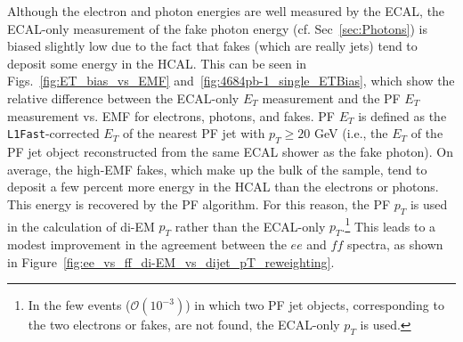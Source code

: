 \documentclass[dissertation.tex]{subfiles}
\begin{document}
Although the electron and photon energies are well measured by the ECAL, the ECAL-only measurement of the fake photon energy (cf. Sec~\ref{sec:Photons}) is biased slightly low due to the fact that fakes (which are really jets) tend to deposit some energy in the HCAL.  This can be seen in Figs.~\ref{fig:ET_bias_vs_EMF} and~\ref{fig:4684pb-1_single_ETBias}, which show the relative difference between the ECAL-only $E_{T}$ measurement and the PF $E_{T}$ measurement vs. EMF for electrons, photons, and fakes.  PF $E_{T}$ is defined as the \verb+L1Fast+-corrected $E_{T}$ of the nearest PF jet with $p_{T} \geq 20$ GeV (i.e., the $E_{T}$ of the PF jet object reconstructed from the same ECAL shower as the fake photon).  On average, the high-EMF fakes, which make up the bulk of the sample, tend to deposit a few percent more energy in the HCAL than the electrons or photons.  This energy is recovered by the PF algorithm.  For this reason, the PF $p_{T}$ is used in the calculation of di-EM $p_{T}$ rather than the ECAL-only $p_{T}$.\footnote{In the few events ($\mathcal{O}(10^{-3})$) in which two PF jet objects, corresponding to the two electrons or fakes, are not found, the ECAL-only $p_{T}$ is used.}  This leads to a modest improvement in the agreement between the $ee$ and $\mathit{ff}$ \MET spectra, as shown in Figure~\ref{fig:ee_vs_ff_di-EM_vs_dijet_pT_reweighting}.
\end{document}

